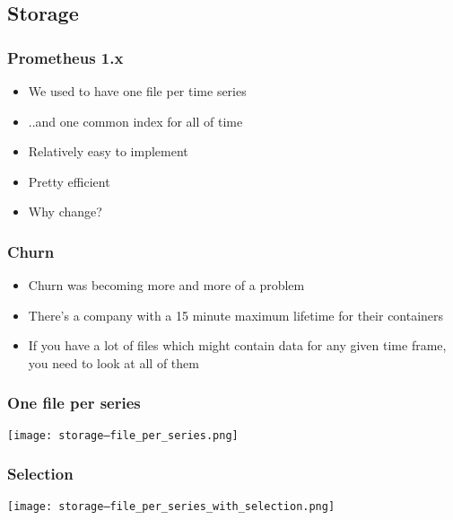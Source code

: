 \documentclass[t]{beamer}
\begin{document}
\subsection{Storage}

\begin{frame}
	\frametitle{Prometheus 1.x}
	\begin{itemize}
		\item We used to have one file per time series
		\item ..and one common index for all of time
		\item Relatively easy to implement
		\item Pretty efficient
		\item Why change?
	\end{itemize}
\end{frame}

\begin{frame}
	\frametitle{Churn}
	\begin{itemize}
		\item Churn was becoming more and more of a problem
		\item There's a company with a 15 minute maximum lifetime for their containers
		\item If you have a lot of files which might contain data for any given time frame, you need to look at all of them
	\end{itemize}
\end{frame}


\begin{frame}
	\frametitle{One file per series}
	\texttt{[image: storage--file\_per\_series.png]}
\end{frame}

\begin{frame}
	\frametitle{Selection}
	\texttt{[image: storage--file\_per\_series\_with\_selection.png]}
\end{frame}
\end{document}
